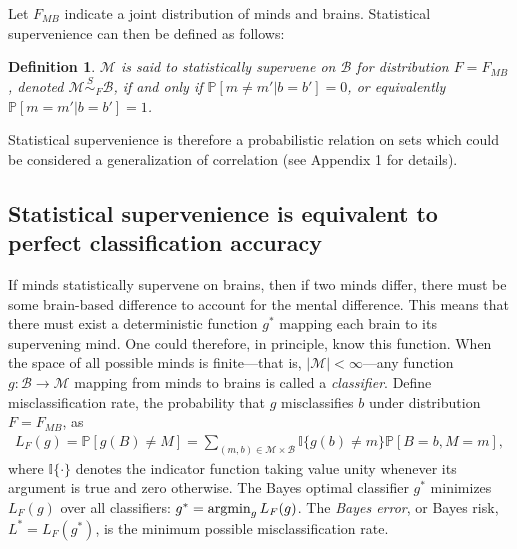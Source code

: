 \documentclass{article}
\newcommand{\mB}{\mathcal{B}}
\newcommand{\mM}{\mathcal{M}}
\newcommand{\PP}{\mathbb{P}}           %
\newcommand{\II}{\mathbb{I}}           %
\providecommand{\mc}[1]{\mathcal{#1}}
\providecommand{\mh}[1]{\widehat{#1}}
\newcommand{\argmin}{\operatornamewithlimits{argmin}}
\newcommand{\MsB}{\mM \overset{S}{\sim}_{F} \mB}
\newcommand{\from}{\colon}
\newtheorem{defi}{Definition}
\begin{document}
Let $F_{MB}$ indicate a joint distribution of minds and brains. Statistical supervenience can then be defined as follows:
\begin{defi}
\label{def:1} 
$\mM$ is said to \textit{statistically supervene} on $\mB$ for distribution $F=F_{MB}$, denoted $\mM \overset{S}{\sim}_F \mB$, if and only if $\PP[m \neq m' | b=b']=0$, or equivalently $\PP[m = m' | b = b']=1$. 
\end{defi}
\noindent Statistical supervenience is therefore a probabilistic relation on sets which could be considered a generalization of correlation (see Appendix 1 for details).  



\subsection*{Statistical supervenience is equivalent to perfect classification accuracy} %
\label{sub:theoretical_results}

If minds statistically supervene on brains, 
then if two minds differ, there must be some brain-based difference to account for the mental difference.  This means that there must exist a deterministic function $g^*$ mapping each brain to its supervening mind. One could therefore, in principle, know this function. When the space of all possible minds is finite---that is, $|\mM| < \infty$---any function $g\from \mB \to \mM$ mapping from minds to brains is called a \emph{classifier}.  
Define misclassification rate, the probability that $g$ misclassifies $b$ under distribution $F=F_{MB}$,  as
\begin{align} \label{eq:1}
L_{F}(g) = \PP[g(B) \neq M] =  \sum_{(m,b) \in \mc{M} \times \mc{B}} \II\{g(b) \neq m\} \PP[B=b, M=m],	
\end{align}
where $\II\{\cdot\}$ denotes the indicator function taking value unity whenever its argument is true and zero otherwise.  The Bayes optimal classifier $g^*$ minimizes $L_{F}(g)$ over all classifiers:	
$g^* = \argmin_{g} L_{F}(g)$.
The \emph{Bayes error}, or Bayes risk, $L^*=L_{F}(g^*)$, is the minimum possible misclassification rate.
\end{document}
